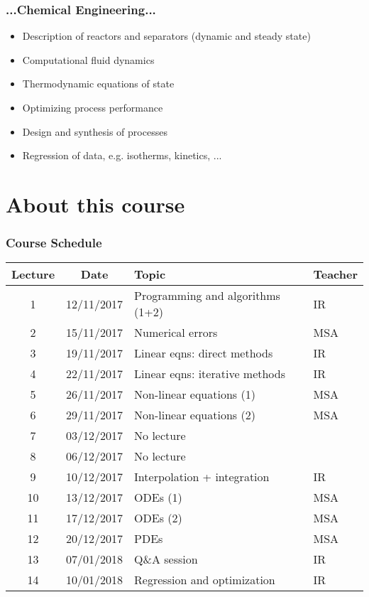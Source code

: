 \documentclass[11pt,table,final,fleqn,xcolor={usenames,dvipsnames},handout]{beamer}
\begin{document}
\begin{frame}
 \frametitle{...Chemical Engineering...}
  \begin{itemize}
	  \item Description of reactors and separators (dynamic and steady state)
		\item Computational fluid dynamics
		\item Thermodynamic equations of state
		\item Optimizing process performance
		\item Design and synthesis of processes
		\item Regression of data, e.g. isotherms, kinetics, ...
 \end{itemize}
\end{frame}

\section{About this course}
\begin{frame}
 \frametitle{Course Schedule}
 \begin{tabular}{ccll}
 \hline
 Lecture & Date & Topic & Teacher \\ 
 \hline
 1 & 12/11/2017 & Programming and algorithms (1+2) & IR \\ 
 2 & 15/11/2017 & Numerical errors & MSA \\ 
 3 & 19/11/2017 & Linear eqns: direct methods & IR\\ 
 4 & 22/11/2017 & Linear eqns: iterative methods & IR \\ 
 5 & 26/11/2017 & Non-linear equations (1) & MSA \\ 
 6 & 29/11/2017 & Non-linear equations (2) & MSA\\ 
 7 & 03/12/2017 & No lecture & \\ 
 8 & 06/12/2017 & No lecture & \\ 
 9 & 10/12/2017 & Interpolation + integration & IR \\ 
 10 & 13/12/2017 & ODEs (1) & MSA \\
 11 & 17/12/2017 & ODEs (2) & MSA \\ 
 12 & 20/12/2017 & PDEs & MSA \\ 
 13 & 07/01/2018 & Q\&A session & IR \\ 
 14 & 10/01/2018 & Regression and optimization & IR \\ 
 \hline
 \end{tabular} 
\end{frame}
\end{document}

